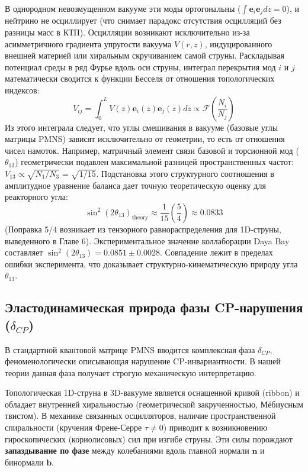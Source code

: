 \documentclass[12pt,a4paper]{article}
\begin{document}
	В однородном невозмущенном вакууме эти моды ортогональны ($\int \mathbf{e}_i \mathbf{e}_j dz = 0$), и нейтрино не осциллирует (что снимает парадокс отсутствия осцилляций без разницы масс в КТП). Осцилляции возникают исключительно из-за асимметричного градиента упругости вакуума $V(r, z)$, индуцированного внешней материей или хиральным скручиванием самой струны.
	Раскладывая потенциал среды в ряд Фурье вдоль оси струны, интеграл перекрытия мод $i$ и $j$ математически сводится к функции Бесселя от отношения топологических индексов:
	\begin{equation}
		V_{ij} = \int_0^L V(z) \mathbf{e}_i(z) \mathbf{e}_j(z) dz \propto \mathcal{F}\left( \frac{N_i}{N_j} \right)
	\end{equation}
	Из этого интеграла следует, что углы смешивания в вакууме (базовые углы матрицы PMNS) зависят исключительно от геометрии, то есть от отношения чисел намоток. Например, матричный элемент связи базовой и торсионной мод ($\theta_{13}$) геометрически подавлен максимальной разницей пространственных частот: $V_{13} \propto \sqrt{N_1 / N_3} = \sqrt{1/15}$. 
	Подстановка этого структурного соотношения в амплитудное уравнение баланса дает точную теоретическую оценку для реакторного угла:
	\begin{equation}
		\sin^2(2\theta_{13})_{\text{theory}} \approx \frac{1}{15} \left( \frac{5}{4} \right) \approx \mathbf{0.0833}
	\end{equation}
	(Поправка 5/4 возникает из тензорного равнораспределения для 1D-струны, выведенного в Главе 6). Экспериментальное значение коллаборации Daya Bay составляет $\sin^2(2\theta_{13}) = \mathbf{0.0851 \pm 0.0028}$. Совпадение лежит в пределах ошибки эксперимента, что доказывает структурно-кинематическую природу угла $\theta_{13}$.
	
	\subsection{Эластодинамическая природа фазы CP-нарушения ($\delta_{CP}$)}
	В стандартной квантовой матрице PMNS вводится комплексная фаза $\delta_{CP}$, феноменологически описывающая нарушение CP-инвариантности. В нашей теории данная фаза получает строгую механическую интерпретацию.
	
	Топологическая 1D-струна в 3D-вакууме является оснащенной кривой (ribbon) и обладает внутренней хиральностью (геометрической закрученностью, Мёбиусным твистом). В механике связанных осцилляторов, наличие пространственной спиральности (кручения Френе-Серре $\tau \neq 0$) приводит к возникновению гироскопических (кориолисовых) сил при изгибе струны. 
	Эти силы порождают \textbf{запаздывание по фазе} между колебаниями вдоль главной нормали $\mathbf{n}$ и бинормали $\mathbf{b}$. 
	
\end{document}

